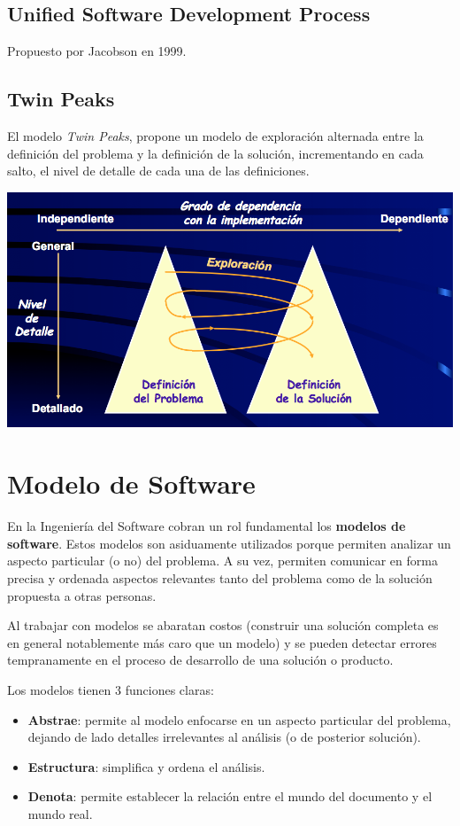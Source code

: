 \documentclass[]{article}
\begin{document}
\subsection{Unified Software Development Process}
Propuesto por Jacobson en 1999.


\subsection{Twin Peaks}
El modelo \textit{Twin Peaks}, propone un modelo de exploración alternada entre la definición del problema y la definición de la solución, incrementando en cada salto, el nivel de detalle de cada una de las definiciones.

\begin{center}
	\includegraphics[scale=0.40]{TwinPeaks.png}
\end{center}

\newpage

\section{Modelo de Software}

En la Ingeniería del Software cobran un rol fundamental los \textbf{modelos de software}. Estos modelos son asiduamente utilizados porque permiten analizar un aspecto particular (o no) del problema. A su vez, permiten comunicar en forma precisa y ordenada aspectos relevantes tanto del problema como de la solución propuesta a otras personas.

Al trabajar con modelos se abaratan costos (construir una solución completa es en general notablemente más caro que un modelo) y se pueden detectar errores tempranamente en el proceso de desarrollo de una solución o producto.

Los modelos tienen 3 funciones claras:
\begin{itemize}
	\item \textbf{Abstrae}: permite al modelo enfocarse en un aspecto particular del problema, dejando de lado detalles irrelevantes al análisis (o de posterior solución).
	\item \textbf{Estructura}: simplifica y ordena el análisis.
	\item \textbf{Denota}: permite establecer la relación entre el mundo del documento y el mundo real.
\end{itemize}
\end{document}
